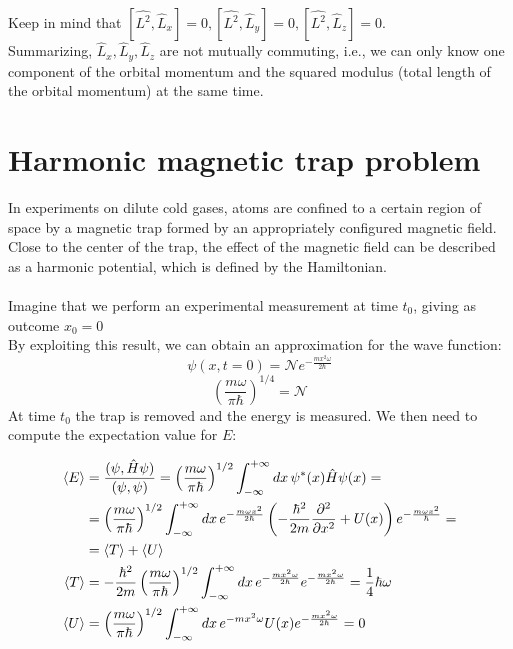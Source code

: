 	Keep in mind that $[\hat{L^2}, \hat{L}_{x}]=0,[\hat{L^2}, \hat{L}_{y}]=0,[\hat{L^2}, \hat{L}_{z}]=0$.\\
	\noindent
	Summarizing,  $\hat{L}_{x},\hat{L}_{y},\hat{L}_{z}$ are not mutually commuting, i.e., we can only know one component of the orbital momentum and the squared modulus (total length of the orbital momentum) at the same time.

\section{Harmonic magnetic trap problem}
In experiments on dilute cold gases, atoms are confined to a certain region of space by a magnetic trap formed by an appropriately configured magnetic field.
Close to the center of the trap, the effect of the magnetic field can be described as a harmonic potential, which is defined by the Hamiltonian.\\
\\
Imagine that we perform an experimental measurement at time $t_0$, giving as outcome $x_{0}=0$ \\
By exploiting this result, we can obtain an approximation for the wave function:
$$\psi(x,t=0)= \mathcal{N} e^{-\frac{m x^{2} \omega}{2 \hbar}}$$
$$
\left(\frac{m \omega}{ \pi \hbar}\right)^{1 / 4}=\mathcal{N}
$$
\noindent
At time $t_0$ the trap is removed and the energy is measured.
We then need to compute the expectation value for $E$:

\begin{align*}
	\expval{E} &=\frac{(\psi, \hat{H} \psi)}{(\psi, \psi)}=\left(\frac{m \omega}{ \pi \hbar}\right)^{1 / 2} \int_{-\infty}^{+\infty}d x\, \psi^{*}(x) \hat{H} \psi(x)=\\
					 	 &=\left(\frac{m \omega}{ \pi \hbar}\right)^{1 / 2} \int_{-\infty}^{+\infty} d x\,e^{-\frac{m \omega x^{2}}{2 \hbar}}\left(-\frac{\hbar^{2}}{2 m} \frac{\partial^{2}}{\partial x^{2}}+U(x)\right) e^{-\frac{m \omega x^{2}}{ \hbar}}=\\
						 &=\expval{T}+\expval{U}\\
	\expval{T} &=-\frac{\hbar^{2}}{2 m}\left(\frac{m \omega}{\pi \hbar}\right)^{1 / 2} \int_{-\infty}^{+\infty} d x\, e^{-\frac{m x^{2} \omega}{2 \hbar}} e^{-\frac{m x^{2} \omega}{2 \hbar}}=\frac{1}{4} \hbar \omega\\
	\expval{U} &=\left(\frac{m \omega}{\pi \hbar}\right)^{1 / 2} \int_{-\infty}^{+\infty} d x\, e^{-m x^{2} \omega} U(x) e^{-\frac{m x^{2} \omega}{2 \hbar}}=0
\end{align*}

